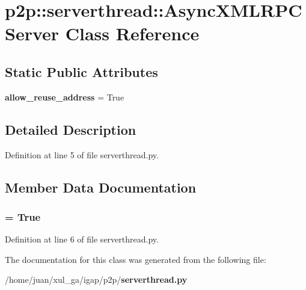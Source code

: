\section{p2p::serverthread::AsyncXMLRPCServer Class Reference}
\label{classp2p_1_1serverthread_1_1AsyncXMLRPCServer}
\subsection*{Static Public Attributes}
\begin{CompactItemize}
\item 
{\bf allow\_\-reuse\_\-address} = True
\end{CompactItemize}


\subsection{Detailed Description}


Definition at line 5 of file serverthread.py.

\subsection{Member Data Documentation}
\subsubsection{ = True\hspace{0.3cm}{\tt  [static]}}\label{classp2p_1_1serverthread_1_1AsyncXMLRPCServer_2c7bd877c9609894a9d540fe29eae499}




Definition at line 6 of file serverthread.py.

The documentation for this class was generated from the following file:\begin{CompactItemize}
\item 
/home/juan/xul\_\-ga/igap/p2p/{\bf serverthread.py}\end{CompactItemize}
